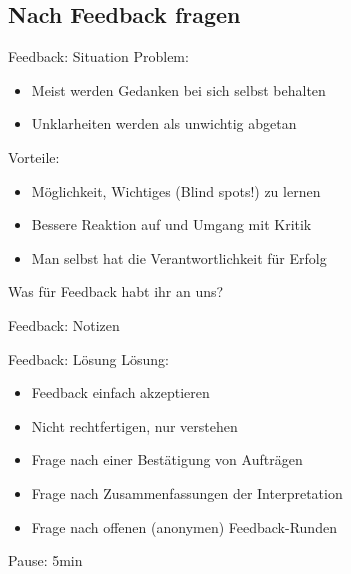 \subsection{Nach Feedback fragen}

\begin{frame}[c]{Feedback: Situation}
    \large
    Problem:
    \begin{itemize}[<+(1)->]
        \item Meist werden Gedanken bei sich selbst behalten
        \item Unklarheiten werden als unwichtig abgetan
    \end{itemize}
    \pause
    Vorteile:
    \begin{itemize}[<+(1)->]
        \item Möglichkeit, Wichtiges (Blind spots!) zu lernen
        \item Bessere Reaktion auf und Umgang mit Kritik
        \item Man selbst hat die Verantwortlichkeit für Erfolg
    \end{itemize}
\end{frame}

\begin{frame}[standout]
    Was für Feedback habt ihr an uns?
\end{frame}

\begin{frame}[c]{Feedback: Notizen}
    
\end{frame}

\begin{frame}[c]{Feedback: Lösung}    
    \large
    Lösung:
    \begin{itemize}[<+(1)->]
        \item Feedback einfach akzeptieren
        \item Nicht rechtfertigen, nur verstehen
        \item Frage nach einer Bestätigung von Aufträgen
        \item Frage nach Zusammenfassungen der Interpretation
        \item Frage nach offenen (anonymen) Feedback-Runden
    \end{itemize}
\end{frame}



\begin{frame}[standout]
    Pause: 5min
\end{frame}




